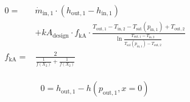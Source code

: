 \begin{equation}
\label{eq:Condenser_kA_char}
\begin{split}
0 = & \dot{m}_\mathrm{in,1} \cdot \left( h_\mathrm{out,1} - h_\mathrm{in,1}\right)\\
&+kA_\mathrm{design} \cdot f_\mathrm{kA} \cdot \frac{T_\mathrm{out,1} - T_\mathrm{in,2} - T_\mathrm{sat}\left( p_\mathrm{in,1}\right) +T_\mathrm{out,2}}{\ln{\frac{T_\mathrm{out,1}-T_\mathrm{in,2}}{T_\mathrm{sat}\left( p_\mathrm{in,1}\right)- T_\mathrm{out,2}}}}\\
f_\mathrm{kA}=&\frac{2}{\frac{1}{f\left(X_2\right)}+\frac{1}{f\left(X_2\right)}}\\
\end{split}
\end{equation}

\begin{equation}
\label{eq:Condenser_subcooling}
0=h_\mathrm{out,1} -h\left(p_\mathrm{out,1}, x=0 \right)
\end{equation}

